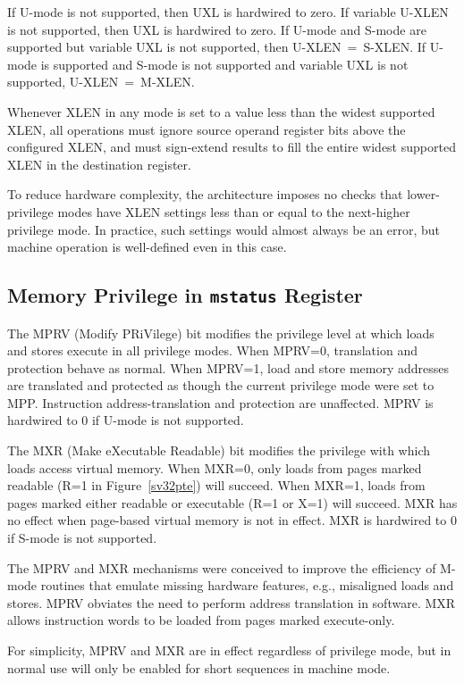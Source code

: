 If U-mode is not supported, then UXL is hardwired to zero.  If
variable U-XLEN is not supported, then UXL is hardwired to zero.  If
U-mode and S-mode are supported but variable UXL is not supported,
then U-XLEN~=~S-XLEN.  If U-mode is supported and S-mode is not
supported and variable UXL is not supported, U-XLEN~=~M-XLEN.

Whenever XLEN in any mode is set to a value less than the widest
supported XLEN, all operations must ignore source operand register
bits above the configured XLEN, and must sign-extend results to fill
the entire widest supported XLEN in the destination register.

\begin{commentary}
To reduce hardware complexity, the architecture imposes no checks that
lower-privilege modes have XLEN settings less than or equal to the
next-higher privilege mode.  In practice, such settings would almost
always be an error, but machine operation is well-defined even in this
case.
\end{commentary}

\subsection{Memory Privilege in {\tt mstatus} Register}

The MPRV (Modify PRiVilege) bit modifies the privilege level at which
loads and stores execute in all privilege modes.  When MPRV=0,
translation and protection behave as normal.  When MPRV=1, load and
store memory addresses are translated and protected as though the
current privilege mode were set to MPP.  Instruction
address-translation and protection are unaffected.  MPRV is hardwired
to 0 if U-mode is not supported.

The MXR (Make eXecutable Readable) bit modifies the privilege with which loads
access virtual memory.  When MXR=0, only loads from pages marked readable (R=1
in Figure~\ref{sv32pte}) will succeed.  When MXR=1, loads from pages marked
either readable or executable (R=1 or X=1) will succeed.  MXR has no effect
when page-based virtual memory is not in effect.  MXR is hardwired to 0 if
S-mode is not supported.

\begin{commentary}
The MPRV and MXR mechanisms were conceived to improve the efficiency of M-mode
routines that emulate missing hardware features, e.g., misaligned loads and
stores.  MPRV obviates the need to perform address translation in software.
MXR allows instruction words to be loaded from pages marked execute-only.

For simplicity, MPRV and MXR are in effect regardless of privilege
mode, but in normal use will only be enabled for short sequences in
machine mode.
\end{commentary}

